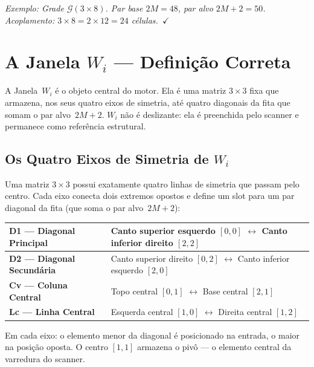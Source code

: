 \documentclass[12pt,a4paper]{article}
\theoremstyle{definition}
\begin{document}
\noindent\textit{Exemplo: Grade $\mathcal{G}(3{\times}8)$. Par base
$2M = 48$, par alvo $2M{+}2 = 50$. Acoplamento: $3{\times}8 = 2{\times}12
= 24$ células.~$\checkmark$}

\section{A Janela \texorpdfstring{$W_i$}{Wi} — Definição Correta}
\label{sec:janela}

A Janela~$W_i$ é o objeto central do motor. Ela é uma matriz $3{\times}3$
fixa que armazena, nos seus quatro eixos de simetria, até quatro diagonais
da fita que somam o par alvo~$2M{+}2$. $W_i$ não é deslizante: ela é
preenchida pelo scanner e permanece como referência estrutural.

\subsection{Os Quatro Eixos de Simetria de \texorpdfstring{$W_i$}{Wi}}
\label{subsec:janela-eixos}

Uma matriz $3{\times}3$ possui exatamente quatro linhas de simetria que
passam pelo centro. Cada eixo conecta dois extremos opostos e define um
slot para um par diagonal da fita (que soma o par alvo~$2M{+}2$):

\renewcommand{\arraystretch}{1.5}
\begin{center}
\begin{tabular}{>{\bfseries}p{3.8cm} p{8cm}}
	\toprule
	D1 — Diagonal Principal & Canto superior esquerdo $[0,0]$ $\leftrightarrow$ Canto inferior direito $[2,2]$ \\
	\midrule
	D2 — Diagonal Secundária & Canto superior direito $[0,2]$ $\leftrightarrow$ Canto inferior esquerdo $[2,0]$ \\
	\midrule
	Cv — Coluna Central & Topo central $[0,1]$ $\leftrightarrow$ Base central $[2,1]$ \\
	\midrule
	Lc — Linha Central & Esquerda central $[1,0]$ $\leftrightarrow$ Direita central $[1,2]$ \\
	\bottomrule
\end{tabular}
\end{center}

\noindent Em cada eixo: o elemento menor da diagonal é posicionado na
entrada, o maior na posição oposta. O centro $[1,1]$ armazena o pivô — o
elemento central da varredura do scanner.
\end{document}
